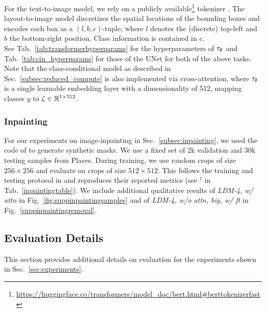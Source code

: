\documentclass[10pt,twocolumn,letterpaper]{article}
\begin{document}
For the text-to-image model, we rely on a publicly available\footnote{\url{https://huggingface.co/transformers/model_doc/bert.html\#berttokenizerfast}} tokenizer 
\cite{DBLP:journals/corr/abs-1910-03771}. 
The layout-to-image model discretizes the spatial locations of the bounding boxes 
and encodes each box as a $(l, b, c)$-tuple, where $l$ denotes the (discrete) top-left and $b$ the 
bottom-right position. Class information is contained in $c$. \\
%
See Tab.~\ref{tab:transformerhyperparams} for the hyperparameters of $\tau_\theta$ and Tab.~\ref{tab:cin_hyperparams} for those of the UNet for both of the above tasks.\\

Note that the class-conditional model as described in Sec.~\ref{subsec:reduced_compute} %
is also implemented via cross-attention, where $\tau_\theta$ is a single learnable
embedding layer with a dimensionality of 512, mapping classes $y$ to 
$\zeta \in \mathbb{R}^{1\times 512}$.

\transformertable
\transformerhyperparams


\subsubsection{Inpainting}
\label{suppsec:inpainting}
\suppinpaintingsamples
\suppinpaintingremoval

For our experiments on image-inpainting in Sec.~\ref{subsec:inpainting}, we
used the code of \cite{lama} to generate synthetic masks. We use a fixed set of
2k validation and 30k testing samples from Places\cite{places}. During
training, we use random crops of size $256\times 256$ and evaluate on crops of
size $512\times 512$. This follows the training and testing protocol in
\cite{lama} and reproduces their reported metrics (see $^\dagger$ in
Tab.~\ref{inpaintingtable}). We include additional qualitative results of
\emph{LDM-4, w/ attn} in
Fig.~\ref{fig:suppinpaintingsamples} and of \emph{LDM-4, w/o attn, big, w/ ft} in
Fig.~\ref{suppinpaintingremoval}.

\subsection{Evaluation Details}
\label{suppsubsec:eval}
\noindent This section provides additional details on evaluation for the experiments shown in Sec.~\ref{sec:experiments}.
\end{document}
